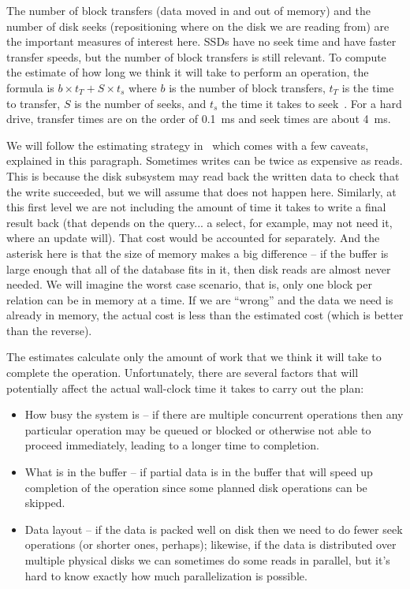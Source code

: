 The number of block transfers (data moved in and out of memory) and the number of disk seeks (repositioning where on the disk we are reading from) are the important measures of interest here. SSDs have no seek time and have faster transfer speeds, but the number of block transfers is still relevant. To compute the estimate of how long we think it will take to perform an operation, the formula is $b \times t_{T} + S \times t_{s}$ where $b$ is the number of block transfers, $t_{T}$ is the time to transfer, $S$ is the number of seeks, and $t_{s}$ the time it takes to seek~\cite{dsc}. For a hard drive, transfer times are on the order of 0.1~ms and seek times are about 4~ms.

We will follow the estimating strategy in~\cite{dsc} which comes with a few caveats, explained in this paragraph. Sometimes writes can be twice as expensive as reads. This is because the disk subsystem may read back the written data to check that the write succeeded, but we will assume that does not happen here. Similarly, at this first level we are not including the amount of time it takes to write a final result back (that depends on the query... a select, for example, may not need it, where an update will). That cost would be accounted for separately. And the asterisk here is that the size of memory makes a big difference -- if the buffer is large enough that all of the database fits in it, then disk reads are almost never needed. We will imagine the worst case scenario, that is, only one block per relation can be in memory at a time. If we are ``wrong'' and the data we need is already in memory, the actual cost is less than the estimated cost (which is better than the reverse). 

The estimates calculate only the amount of work that we think it will take to complete the operation. Unfortunately, there are several factors that will potentially affect the actual wall-clock time it takes to carry out the plan:

\begin{itemize}
	\item How busy the system is -- if there are multiple concurrent operations then any particular operation may be queued or blocked or otherwise not able to proceed immediately, leading to a longer time to completion.
	\item What is in the buffer -- if partial data is in the buffer that will speed up completion of the operation since some planned disk operations can be skipped.
	\item Data layout -- if the data is packed well on disk then we need to do fewer seek operations (or shorter ones, perhaps); likewise, if the data is distributed over multiple physical disks we can sometimes do some reads in parallel, but it's hard to know exactly how much parallelization is possible.
\end{itemize}

